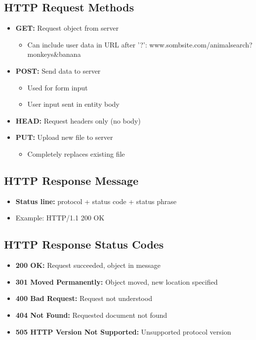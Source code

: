 \documentclass[12pt]{article}
\begin{document}
\subsection{HTTP Request Methods}
\begin{itemize}
    \item \textbf{GET:} Request object from server
          \begin{itemize}
              \item Can include user data in URL after '?': www.sombsite.com/animalsearch?monkeys\&banana
          \end{itemize}

    \item \textbf{POST:} Send data to server
          \begin{itemize}
              \item Used for form input
              \item User input sent in entity body
          \end{itemize}

    \item \textbf{HEAD:} Request headers only (no body)
    \item \textbf{PUT:} Upload new file to server
          \begin{itemize}
              \item Completely replaces existing file
          \end{itemize}
\end{itemize}

\subsection{HTTP Response Message}
\begin{itemize}
    \item \textbf{Status line:} protocol + status code + status phrase
    \item Example: HTTP/1.1 200 OK
\end{itemize}

\subsection{HTTP Response Status Codes}
\begin{itemize}
    \item \textbf{200 OK:} Request succeeded, object in message
    \item \textbf{301 Moved Permanently:} Object moved, new location specified
    \item \textbf{400 Bad Request:} Request not understood
    \item \textbf{404 Not Found:} Requested document not found
    \item \textbf{505 HTTP Version Not Supported:} Unsupported protocol version
\end{itemize}
\end{document}
